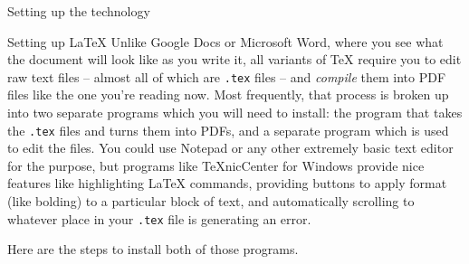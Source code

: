\documentclass[sheet]{GameTexBase}
\begin{document}
\begin{section}{Setting up the technology}
\begin{subsection}{Setting up \LaTeX{}}
Unlike Google Docs or Microsoft Word, where you see what the document will look like as you write it, all variants of \TeX{} require you to edit raw text files -- almost all of which are \lstinline{.tex} files -- and \emph{compile} them into PDF files like the one you're reading now.  Most frequently, that process is broken up into two separate programs which you will need to install: the program that takes the \lstinline{.tex} files and turns them into PDFs, and a separate program which is used to edit the files.  You could use Notepad or any other extremely basic text editor for the purpose, but programs like TeXnicCenter for Windows provide nice features like highlighting \LaTeX{} commands, providing buttons to apply format (like bolding) to a particular block of text, and automatically scrolling to whatever place in your \lstinline{.tex} file is generating an error.

Here are the steps to install both of those programs.


\end{subsection}
\end{section}
\end{document}
